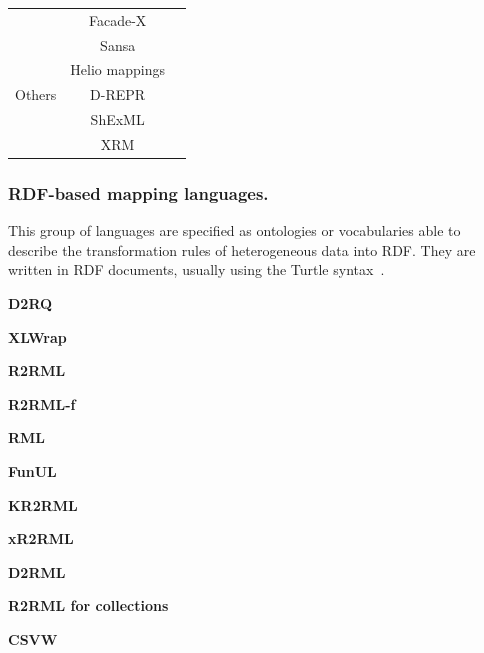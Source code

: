 \begin{table}[t]
\begin{tabular}{c|c|c}
                              & Facade-X        & \parencite{asprino2023sparql-anything,sparqlanything}\\ \cline{2-3}
                              & Sansa            & \parencite{stadler2023spark}\\ \hline
\multirow{3}{*}{Others}       & Helio mappings  & \parencite{cimmino2022helio}\\ \cline{2-3} 
                              & D-REPR          & \parencite{Vu2019d-repr}\\ \cline{2-3} 
                              & ShExML          & \parencite{Garcia-Gonzalez2020shexml,shexml}\\ \cline{2-3}
                              & XRM             & \parencite{xrm}\\ \hline
\end{tabular}
\end{table}

\subsubsection{RDF-based mapping languages.} 

This group of languages are specified as ontologies or vocabularies able to describe the transformation rules of heterogeneous data into RDF. They are written in RDF documents, usually using the Turtle syntax~\parencite{turtle}. 



\noindent\textbf{D2RQ}~\parencite{bizer2004d2rq}

\noindent\textbf{XLWrap}~\parencite{langegger2009xlwrap}

\noindent\textbf{R2RML}~\parencite{das2012r2rml}

\noindent\textbf{R2RML-f}~\parencite{debruyne2016r2rmlf}

\noindent\textbf{RML}~\parencite{Dimou2014rml}

\noindent\textbf{FunUL}~\parencite{junior2016funul}

\noindent\textbf{KR2RML}~\parencite{slepicka2015kr2rml}

\noindent\textbf{xR2RML}~\parencite{michel2015xr2rml}

\noindent\textbf{D2RML}~\parencite{chortaras2018d2rml}

\noindent\textbf{R2RML for collections}

\noindent\textbf{CSVW}~\parencite{Tennison2015csvw}

